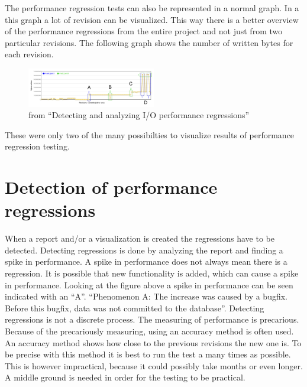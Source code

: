 The performance regression tests can also be represented in a normal graph. In a this graph a lot of revision can be visualized. This way there is a better overview of the performance regressions from the entire project and not just from two particular revisions. The following graph shows the number of written bytes for each revision.

\begin{figure}[h]
\begin{center}
  \includegraphics[width=0.5\textwidth]{Figures/bytegraph.png}
\end{center}
  \caption{from ``Detecting and analyzing I/O performance regressions''\cite{bezemer2014detecting}}

\end{figure}

These were only two of the many possibilties to visualize results of performance regression testing.

\section{Detection of performance regressions}
When a report and/or a visualization is created the regressions have to be detected. Detecting regressions is done by analyzing the report and finding a spike in performance. A spike in performance does not always mean there is a regression. It is possible that new functionality is added, which can cause a spike in performance. Looking at the figure above a spike in performance can be seen indicated with an ``A''. ``Phenomenon A: The increase was caused by a bugfix. Before this bugfix, data was not committed to the database''\cite{bezemer2014detecting}.\newline
Detecting regressions is not a discrete process. The measuring of performance is precarious. Because of the precariously measuring, using an accuracy method is often used. An accuracy method shows how close to the previous revisions the new one is. To be precise with this method it is best to run the test a many times as possible. This is however impractical, because it could possibly take months or even longer. A middle ground is needed in order for the testing to be practical.\newline
\newline





